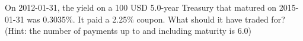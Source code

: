 On 2012-01-31, the yield on a 100 USD 5.0-year Treasury that matured on 2015-01-31 was 0.3035\%. It paid a 2.25\% coupon. What should it have traded for? (Hint: the number of payments up to and including maturity is 6.0)
